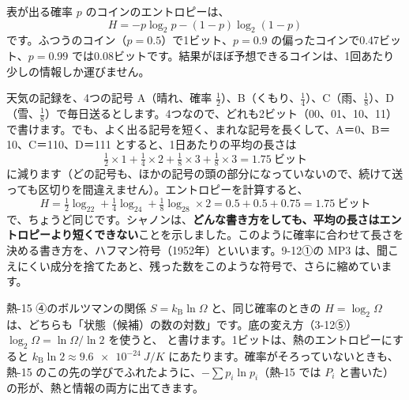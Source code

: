 \noindent\begin{minipage}[c]{0.5\linewidth}\raggedright
表が出る確率 $p$ のコインのエントロピーは、
\[H=-p\log_2p-(1-p)\log_2(1-p)\]
です。ふつうのコイン（$p=0.5$）で1ビット、$p=0.9$ の偏ったコインで0.47ビット、$p=0.99$ では0.08ビットです。結果がほぼ予想できるコインは、1回あたり少しの情報しか運びません。
\end{minipage}\hfill
\begin{minipage}[c]{0.46\linewidth}\centering
{}
\end{minipage}

天気の記録を、4つの記号 A（晴れ、確率 $\tfrac12$）、B（くもり、$\tfrac14$）、C（雨、$\tfrac18$）、D（雪、$\tfrac18$）で毎日送るとします。4つなので、どれも2ビット（00、01、10、11）で書けます。でも、よく出る記号を短く、まれな記号を長くして、A＝0、B＝10、C＝110、D＝111 とすると、1日あたりの平均の長さは
\[\tfrac12\times1+\tfrac14\times2+\tfrac18\times3+\tfrac18\times3=1.75\ \text{ビット}\]
に減ります（どの記号も、ほかの記号の頭の部分になっていないので、続けて送っても区切りを間違えません）。エントロピーを計算すると、
\[H=\tfrac12\log_22+\tfrac14\log_24+\tfrac18\log_28\times2=0.5+0.5+0.75=1.75\ \text{ビット}\]
で、ちょうど同じです。シャノンは、\textbf{どんな書き方をしても、平均の長さはエントロピーより短くできない}ことを示しました。このように確率に合わせて長さを決める書き方を、ハフマン符号（1952年）といいます。9-12①の MP3 は、聞こえにくい成分を捨てたあと、残った数をこのような符号で、さらに縮めています。

熱-15 ④のボルツマンの関係 $S=k_{\mathrm B}\ln\Omega$ と、同じ確率のときの $H=\log_2\Omega$ は、どちらも「状態（候補）の数の対数」です。底の変え方（3-12⑤）$\log_2\Omega=\ln\Omega/\ln2$ を使うと、
と書けます。1ビットは、熱のエントロピーにすると $k_{\mathrm B}\ln2\approx\qty{9.6e-24}{J/K}$ にあたります。確率がそろっていないときも、熱-15 のこの先の学びでふれたように、$-\sum p_i\ln p_i$（熱-15 では $P_i$ と書いた）の形が、熱と情報の両方に出てきます。

